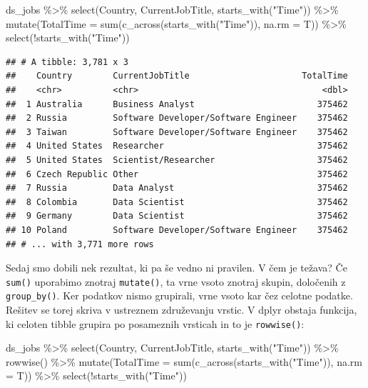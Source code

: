 \documentclass[
]{book}
\newenvironment{Shaded}{\begin{snugshade}}{\end{snugshade}}
\newcommand{\AttributeTok}[1]{\textcolor[rgb]{0.77,0.63,0.00}{#1}}
\newcommand{\FunctionTok}[1]{\textcolor[rgb]{0.00,0.00,0.00}{#1}}
\newcommand{\NormalTok}[1]{#1}
\newcommand{\SpecialCharTok}[1]{\textcolor[rgb]{0.00,0.00,0.00}{#1}}
\newcommand{\StringTok}[1]{\textcolor[rgb]{0.31,0.60,0.02}{#1}}
\begin{document}
\begin{Shaded}
\begin{Highlighting}[]
\NormalTok{ds\_jobs }\SpecialCharTok{\%\textgreater{}\%}
  \FunctionTok{select}\NormalTok{(Country, CurrentJobTitle, }\FunctionTok{starts\_with}\NormalTok{(}\StringTok{"Time"}\NormalTok{)) }\SpecialCharTok{\%\textgreater{}\%}
  \FunctionTok{mutate}\NormalTok{(}\AttributeTok{TotalTime =} \FunctionTok{sum}\NormalTok{(}\FunctionTok{c\_across}\NormalTok{(}\FunctionTok{starts\_with}\NormalTok{(}\StringTok{"Time"}\NormalTok{)), }\AttributeTok{na.rm =}\NormalTok{ T)) }\SpecialCharTok{\%\textgreater{}\%}
  \FunctionTok{select}\NormalTok{(}\SpecialCharTok{!}\FunctionTok{starts\_with}\NormalTok{(}\StringTok{"Time"}\NormalTok{))}
\end{Highlighting}
\end{Shaded}

\begin{verbatim}
## # A tibble: 3,781 x 3
##    Country        CurrentJobTitle                      TotalTime
##    <chr>          <chr>                                    <dbl>
##  1 Australia      Business Analyst                        375462
##  2 Russia         Software Developer/Software Engineer    375462
##  3 Taiwan         Software Developer/Software Engineer    375462
##  4 United States  Researcher                              375462
##  5 United States  Scientist/Researcher                    375462
##  6 Czech Republic Other                                   375462
##  7 Russia         Data Analyst                            375462
##  8 Colombia       Data Scientist                          375462
##  9 Germany        Data Scientist                          375462
## 10 Poland         Software Developer/Software Engineer    375462
## # ... with 3,771 more rows
\end{verbatim}

Sedaj smo dobili nek rezultat, ki pa še vedno ni pravilen. V čem je težava? Če \texttt{sum()} uporabimo znotraj \texttt{mutate()}, ta vrne vsoto znotraj skupin, določenih z \texttt{group\_by()}. Ker podatkov nismo grupirali, vrne vsoto kar čez celotne podatke. Rešitev se torej skriva v ustreznem združevanju vrstic. V dplyr obstaja funkcija, ki celoten tibble grupira po posameznih vrsticah in to je \texttt{rowwise()}:

\begin{Shaded}
\begin{Highlighting}[]
\NormalTok{ds\_jobs }\SpecialCharTok{\%\textgreater{}\%}
  \FunctionTok{select}\NormalTok{(Country, CurrentJobTitle, }\FunctionTok{starts\_with}\NormalTok{(}\StringTok{"Time"}\NormalTok{)) }\SpecialCharTok{\%\textgreater{}\%}
  \FunctionTok{rowwise}\NormalTok{() }\SpecialCharTok{\%\textgreater{}\%}
  \FunctionTok{mutate}\NormalTok{(}\AttributeTok{TotalTime =} \FunctionTok{sum}\NormalTok{(}\FunctionTok{c\_across}\NormalTok{(}\FunctionTok{starts\_with}\NormalTok{(}\StringTok{"Time"}\NormalTok{)), }\AttributeTok{na.rm =}\NormalTok{ T)) }\SpecialCharTok{\%\textgreater{}\%}
  \FunctionTok{select}\NormalTok{(}\SpecialCharTok{!}\FunctionTok{starts\_with}\NormalTok{(}\StringTok{"Time"}\NormalTok{))}
\end{Highlighting}
\end{Shaded}
\end{document}
